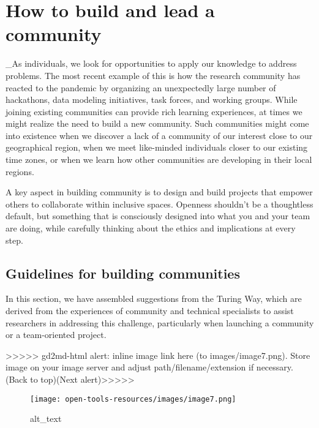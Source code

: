 \documentclass[
  letterpaper,
  DIV=11,
  numbers=noendperiod]{scrreport}
\begin{document}
\hypertarget{how-to-build-and-lead-a-community}{%
\section{How to build and lead a
community}\label{how-to-build-and-lead-a-community}}

\_As individuals, we look for opportunities to apply our knowledge to
address problems. The most recent example of this is how the research
community has reacted to the pandemic by organizing an unexpectedly
large number of hackathons, data modeling initiatives, task forces, and
working groups. While joining existing communities can provide rich
learning experiences, at times we might realize the need to build a new
community. Such communities might come into existence when we discover a
lack of a community of our interest close to our geographical region,
when we meet like-minded individuals closer to our existing time zones,
or when we learn how other communities are developing in their local
regions.

A key aspect in building community is to design and build projects that
empower others to collaborate within inclusive spaces. Openness
shouldn't be a thoughtless default, but something that is consciously
designed into what you and your team are doing, while carefully thinking
about the ethics and implications at every step.

\hypertarget{guidelines-for-building-communities}{%
\subsection{Guidelines for building
communities}\label{guidelines-for-building-communities}}

In this section, we have assembled suggestions from the Turing Way,
which are derived from the experiences of community and technical
specialists to assist researchers in addressing this challenge,
particularly when launching a community or a team-oriented project.

{\textgreater\textgreater\textgreater\textgreater\textgreater{}
gd2md-html alert: inline image link here (to images/image7.png). Store
image on your image server and adjust path/filename/extension if
necessary. }(Back to top)(Next
alert){\textgreater\textgreater\textgreater\textgreater\textgreater{} }

\begin{figure}

{\centering \texttt{[image: open-tools-resources/images/image7.png]}

}

\caption{alt\_text}

\end{figure}
\end{document}
